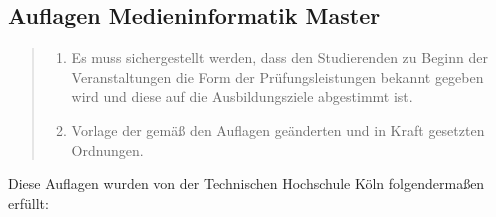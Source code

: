 \subsection{Auflagen Medieninformatik
Master}\label{auflagen-medieninformatik-master}

\begin{quote}
\begin{enumerate}
\def\labelenumi{\arabic{enumi}.}
\tightlist
\item
  Es muss sichergestellt werden, dass den Studierenden zu Beginn der
  Veranstaltungen die Form der Prüfungsleistungen bekannt gegeben wird
  und diese auf die Ausbildungsziele abgestimmt ist.
\item
  Vorlage der gemäß den Auflagen geänderten und in Kraft gesetzten
  Ordnungen.
\end{enumerate}
\end{quote}

Diese Auflagen wurden von der Technischen Hochschule Köln folgendermaßen
erfüllt:

